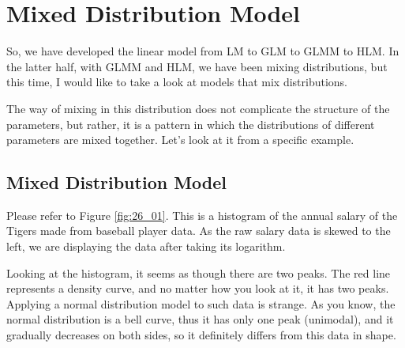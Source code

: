 \documentclass{ltjsbook}
\begin{document}
\VerbatimFootnotes
\chapter{Mixed Distribution Model}
\label{x26_mixed}
So, we have developed the linear model from LM to GLM to GLMM to HLM. In the latter half, with GLMM and HLM, we have been mixing distributions, but this time, I would like to take a look at models that mix distributions.


The way of mixing in this distribution does not complicate the structure of the parameters, but rather, it is a pattern in which the distributions of different parameters are mixed together. Let's look at it from a specific example.
\section{Mixed Distribution Model}
Please refer to Figure \ref{fig:26_01}. This is a histogram of the annual salary of the Tigers made from baseball player data. As the raw salary data is skewed to the left, we are displaying the data after taking its logarithm.

Looking at the histogram, it seems as though there are two peaks. The red line represents a density curve, and no matter how you look at it, it has two peaks.
Applying a normal distribution model to such data is strange. As you know, the normal distribution is a bell curve, thus it has only one peak (unimodal), and it gradually decreases on both sides, so it definitely differs from this data in shape.
\end{document}
